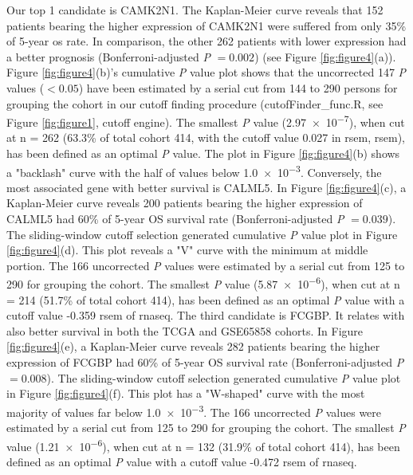 \documentclass[jpm,article,submit,moreauthors,pdftex]{Definitions/mdpi}
\begin{document}
Our top 1 candidate is \acrfull{CAMK2N1}. The Kaplan-Meier curve reveals that 152 patients bearing the higher expression of \acrshort{CAMK2N1} were suffered from only 35\% of 5-year \acrshort{os} rate. In comparison, the other 262 patients with lower expression had a better prognosis (Bonferroni-adjusted \textit{P} $= 0.002$) (see Figure \ref{fig:figure4}(a)).
Figure \ref{fig:figure4}(b)'s cumulative \textit{P} value plot shows that the uncorrected 147 \textit{P} values ($< 0.05$) have been estimated by a serial cut from 144 to 290 persons for grouping the cohort in our cutoff finding procedure (cutofFinder\_func.R, see Figure \ref{fig:figure1}, cutoff engine). The smallest \textit{P} value (\num{2.97e-7}), when cut at n = 262 (63.3\% of total cohort 414, with the cutoff value 0.027 in \acrlong{rsem}, \acrshort{rsem}), has been defined as an optimal \textit{P} value.
The plot in Figure \ref{fig:figure4}(b) shows a "backlash" curve with the half of values below \num{1.0e-3}.
Conversely, the most associated gene with better survival is \acrfull{CALML5}. In Figure \ref{fig:figure4}(c), a Kaplan-Meier curve reveals 200 patients bearing the higher expression of \acrshort{CALML5} had 60\% of 5-year OS survival rate (Bonferroni-adjusted \textit{P} $ = 0.039$). The sliding-window cutoff selection generated cumulative \textit{P} value plot in Figure \ref{fig:figure4}(d). This plot reveals a "V" curve with the minimum at middle portion.
The 166 uncorrected \textit{P} values were estimated by a serial cut from 125 to 290 for grouping the cohort. The smallest \textit{P} value (\num{5.87e-6}), when cut at n = 214 (51.7\% of total cohort 414), has been defined as an optimal \textit{P} value with a cutoff value -0.359 \acrshort{rsem} of \acrshort{rnaseq}.
The third candidate is \acrfull{FCGBP}.
It relates with also better survival in both the TCGA and GSE65858 cohorts. In Figure \ref{fig:figure4}(e), a Kaplan-Meier curve reveals 282 patients bearing the higher expression of \acrshort{FCGBP} had 60\% of 5-year OS survival rate (Bonferroni-adjusted \textit{P} $ = 0.008$). The sliding-window cutoff selection generated cumulative \textit{P} value plot in Figure \ref{fig:figure4}(f). This plot has a "W-shaped" curve with the most majority of values far below \num{1.0e-3}.
The 166 uncorrected \textit{P} values were estimated by a serial cut from 125 to 290 for grouping the cohort. The smallest \textit{P} value (\num{1.21e-6}), when cut at n = 132 (31.9\% of total cohort 414), has been defined as an optimal \textit{P} value with a cutoff value -0.472 \acrshort{rsem} of \acrshort{rnaseq}.
\end{document}
